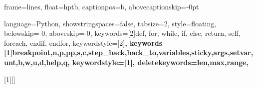   
  
 {frame=lines,
  float=hptb,
  captionpos=b,
  abovecaptionskip=-0pt}

 {language=Python,
  showstringspaces=false,
  tabsize=2,
  style=floating,
  belowskip=-0\baselineskip,
  aboveskip=-0\baselineskip,
  keywords=[2]{def, for, while, if, else, return, self, foreach, endif, endfor},
  keywordstyle=[2]\ttfamily\bfseries,
  keywords=[1]{breakpoint,n,p,pp,s,c,step_back,back_to,variables,sticky,args,setvar,unt,b,w,u,d,help,q},
  keywordstyle=[1]\ttfamily\bfseries\color{blue},
  deletekeywords={len,max,range},
}

 [1][]
 {\lstset{style=py,#1}}{}  

\newcommand{\spy}[1]{\lstinline[style=py]{#1}}


\usepackage[many]{tcolorbox} 
\usepackage{setspace} 

\setlength\parindent{0pt}   %
\pagestyle{empty}           %




\newtcolorbox{highlight}{
    colback = sub, 
    colframe = main, 
    boxrule = 0pt, 
    leftrule = 3pt %
}



